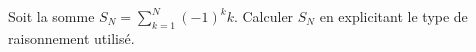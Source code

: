 %
%
	Soit la somme $S_N = \sum\limits_{k=1}^{N}(-1)^k k$. Calculer $S_N$ en explicitant le type de raisonnement utilisé.

